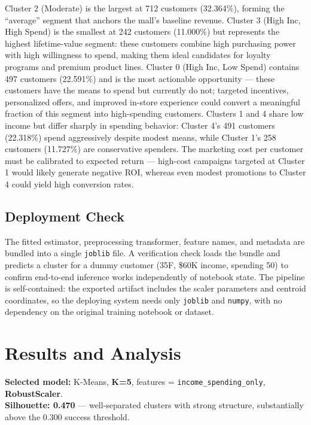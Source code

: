 Cluster 2 (Moderate) is the largest at 712 customers (32.364\%), forming the ``average'' segment that anchors the mall's baseline revenue. Cluster 3 (High Inc, High Spend) is the smallest at 242 customers (11.000\%) but represents the highest lifetime-value segment: these customers combine high purchasing power with high willingness to spend, making them ideal candidates for loyalty programs and premium product lines. Cluster 0 (High Inc, Low Spend) contains 497 customers (22.591\%) and is the most actionable opportunity --- these customers have the means to spend but currently do not; targeted incentives, personalized offers, and improved in-store experience could convert a meaningful fraction of this segment into high-spending customers. Clusters 1 and 4 share low income but differ sharply in spending behavior: Cluster 4's 491 customers (22.318\%) spend aggressively despite modest means, while Cluster 1's 258 customers (11.727\%) are conservative spenders. The marketing cost per customer must be calibrated to expected return --- high-cost campaigns targeted at Cluster 1 would likely generate negative ROI, whereas even modest promotions to Cluster 4 could yield high conversion rates.

\subsection{Deployment Check}
The fitted estimator, preprocessing transformer, feature names, and metadata are bundled into a single \texttt{joblib} file. A verification check loads the bundle and predicts a cluster for a dummy customer (35F, \$60K income, spending 50) to confirm end-to-end inference works independently of notebook state. The pipeline is self-contained: the exported artifact includes the scaler parameters and centroid coordinates, so the deploying system needs only \texttt{joblib} and \texttt{numpy}, with no dependency on the original training notebook or dataset.

\section{Results and Analysis}

\begin{resultbox}
\textbf{Selected model:} K-Means, \textbf{K=5}, features = \texttt{income\_spending\_only}, \textbf{RobustScaler}.\\
\textbf{Silhouette: 0.470} --- well-separated clusters with strong structure, substantially above the 0.300 success threshold.
\end{resultbox}

